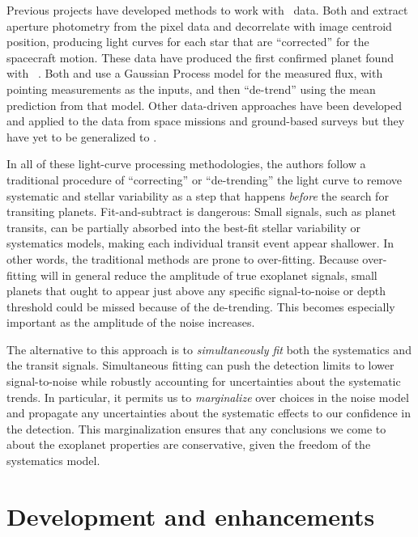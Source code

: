 \documentclass[12pt,preprint]{aastex}
\begin{document}
Previous projects have developed methods to work with \KT\ data.
Both \citet{Vanderburg:2014} and \citet{Armstrong:2014}
extract aperture photometry from the pixel data
and decorrelate with image centroid position, producing light curves for each
star that are ``corrected'' for the spacecraft motion.
These data have produced the first confirmed planet found with
\KT\ \citep{Vanderburg:2015}.
Both \citet{Aigrain:2015} and \citet{Crossfield:2015} use a Gaussian Process
model for the measured flux, with pointing measurements as the inputs, and
then ``de-trend'' using the mean prediction from that model.
Other data-driven approaches have been developed and applied to the data from
space missions \citep[for example,][]{Ofir:2010, Stumpe:2012, Smith:2012,
Petigura:2013, Wang:2015} and ground-based surveys \citep[for
example,][]{Kovacs:2005, Tamuz:2005, Berta:2012} but they have yet to be
generalized to \KT.

In all of these light-curve processing methodologies, the authors follow a
traditional procedure of ``correcting'' or ``de-trending'' the light curve to
remove systematic and stellar variability as a step that happens \emph{before}
the search for transiting planets.
Fit-and-subtract is dangerous:
Small signals, such as planet transits, can be
partially absorbed into the best-fit stellar variability or systematics
models, making each individual transit event appear shallower.
In other words, the traditional methods are prone to over-fitting.
Because over-fitting will in general reduce the amplitude of true exoplanet
signals, small planets that ought to appear just above any specific
signal-to-noise or depth threshold could be missed because of the de-trending.
This becomes especially important as the amplitude of the noise increases.

The alternative to this approach is to \emph{simultaneously fit} both the
systematics and the transit signals.
Simultaneous fitting can push the detection limits to lower signal-to-noise
while robustly accounting for uncertainties about the systematic trends.
In particular, it permits us to \emph{marginalize} over choices in the noise
model and propagate any uncertainties about the systematic effects
to our confidence in the detection.
This marginalization ensures that any conclusions we come to about the
exoplanet properties are conservative, given the freedom of the systematics
model.


\section{Development and enhancements}
\end{document}
